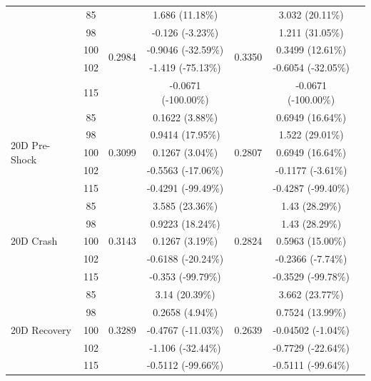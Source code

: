 \begin{table}[htbp]
{\begin{tabular}{lclcccc}
    & 85 & \multirow{5}{*}{0.2984} & 1.686 (11.18\%) & \multirow{5}{*}{0.3350} & 3.032 (20.11\%) \\
    & 98 & & -0.126 (-3.23\%) & & 1.211 (31.05\%) \\
    & 100 & & -0.9046 (-32.59\%) & & 0.3499 (12.61\%) \\
    & 102 & & -1.419 (-75.13\%) & & -0.6054 (-32.05\%) \\
    & 115 & & -0.0671 (-100.00\%) & & -0.0671 (-100.00\%) \\
    \midrule
    \multirow{5}{*}{20D Pre-Shock}
    & 85 & \multirow{5}{*}{0.3099} & 0.1622 (3.88\%) & \multirow{5}{*}{0.2807} & 0.6949 (16.64\%) \\
    & 98 & & 0.9414 (17.95\%) & & 1.522 (29.01\%) \\
    & 100 & & 0.1267 (3.04\%) & & 0.6949 (16.64\%) \\
    & 102 & & -0.5563 (-17.06\%) & & -0.1177 (-3.61\%) \\
    & 115 & & -0.4291 (-99.49\%) & & -0.4287 (-99.40\%) \\
    \midrule
    \multirow{5}{*}{20D Crash}
    & 85 & \multirow{5}{*}{0.3143} & 3.585 (23.36\%) & \multirow{5}{*}{0.2824} & 1.43 (28.29\%) \\
    & 98 & & 0.9223 (18.24\%) & & 1.43 (28.29\%) \\
    & 100 & & 0.1267 (3.19\%) & & 0.5963 (15.00\%) \\
    & 102 & & -0.6188 (-20.24\%) & & -0.2366 (-7.74\%) \\
    & 115 & & -0.353 (-99.79\%) & & -0.3529 (-99.78\%) \\
    \midrule
    \multirow{5}{*}{20D Recovery}
    & 85 & \multirow{5}{*}{0.3289} & 3.14 (20.39\%) & \multirow{5}{*}{0.2639} & 3.662 (23.77\%) \\
    & 98 & & 0.2658 (4.94\%) & & 0.7524 (13.99\%) \\
    & 100 & & -0.4767 (-11.03\%) & & -0.04502 (-1.04\%) \\
    & 102 & & -1.106 (-32.44\%) & & -0.7729 (-22.64\%) \\
    & 115 & & -0.5112 (-99.66\%) & & -0.5111 (-99.64\%) \\
    \bottomrule
  \end{tabular}%
  }
\end{table}

